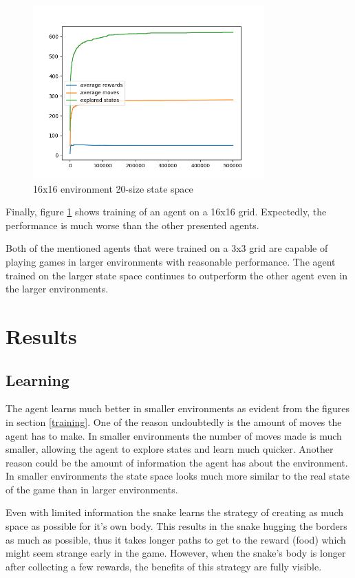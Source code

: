 \documentclass[lettersize,journal]{IEEEtran}
\begin{document}
\begin{figure}[!t]
\centering
\includegraphics[width=3.5in]{16_fig.png}
\caption{16x16 environment 20-size state space}
\label{fig3}
\end{figure}


Finally, figure \ref{fig3} shows training of an agent on a 16x16 grid.
Expectedly, the performance is much worse than the other presented agents.

Both of the mentioned agents that were trained on a 3x3 grid are capable of playing games in larger environments with
reasonable performance. The agent trained on the larger state space continues
to outperform the other agent even in the larger environments.


\section{Results}

\subsection{Learning}
The agent learns much better in smaller environments as evident from
the figures in section \ref{training}. One of the reason
undoubtedly is the amount of moves the agent has to make. In
smaller environments the number of moves made is much smaller,
allowing the agent to explore states and learn much quicker.
Another reason could be the amount of information the agent has
about the environment. In smaller environments the state space
looks much more similar to the real state of the game than in
larger environments.

Even with limited information the snake learns the strategy
of creating as much space as possible for it's own body.
This results in the snake hugging the borders as much
as possible, thus it takes longer paths to get to the reward (food) which
might seem strange early in the game.
However, when the snake's body is longer after collecting a
few rewards, the benefits of this strategy are fully visible.
\end{document}
